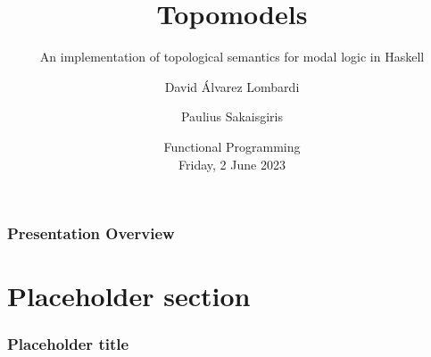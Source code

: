 \documentclass[
	11pt, %
	aspectratio=1610, %
]{beamer}
\title[Topomodels]{Topomodels} %
\subtitle{An implementation of topological semantics for modal logic in Haskell} %
\author[David Álvarez Lombardi \& Paulius Sakaisgiris]{David Álvarez Lombardi \and Paulius Sakaisgiris} %
\institute[ILLC]{Institute for Logic, Language, and Computation \\ \smallskip University of Amsterdam} %
\date[16 May 2023]{Functional Programming\\ \smallskip Friday, 2 June 2023} %
\begin{document}

\begin{frame}
	\titlepage %
\end{frame}



\begin{frame}
	\frametitle{Presentation Overview} %

	\tableofcontents[pausesections] %
\end{frame}


\section{Placeholder section}


\begin{frame}
	\frametitle{Placeholder title}

\end{frame}
\end{document}
